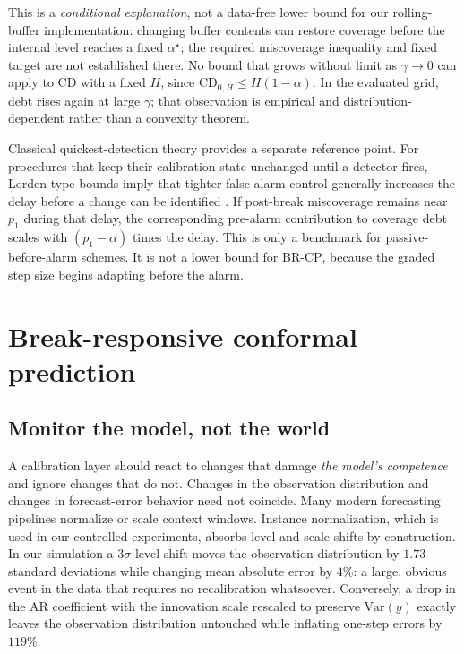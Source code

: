 \documentclass[10pt]{article}
\newcommand{\brcp}{\textsc{BR-CP}}
\begin{document}
This is a \emph{conditional explanation}, not a data-free lower bound for
our rolling-buffer implementation: changing buffer contents can restore
coverage before the internal level reaches a fixed $\alpha^\star$; the
required miscoverage inequality and fixed target are not established there.
No bound that grows without limit as $\gamma\to0$ can apply to CD with a
fixed $H$, since $\mathrm{CD}_{0,H}\leq H(1-\alpha)$.
In the evaluated grid, debt rises again at large $\gamma$; that observation
is empirical and distribution-dependent rather than a convexity theorem.

Classical quickest-detection theory provides a separate reference point. For procedures that keep their calibration state unchanged until a detector fires, Lorden-type bounds imply that tighter false-alarm control generally increases the delay before a change can be identified \citep{lorden1971procedures}. If post-break miscoverage remains near $p_1$ during that delay, the corresponding pre-alarm contribution to coverage debt scales with $(p_1-\alpha)$ times the delay. This is only a benchmark for passive-before-alarm schemes. It is not a lower bound for \brcp{}, because the graded step size begins adapting before the alarm.

\section{Break-responsive conformal prediction}
\label{sec:method}

\subsection{Monitor the model, not the world}

A calibration layer should react to changes that damage \emph{the model's
competence} and ignore changes that do not. Changes in the observation
distribution and changes in forecast-error behavior need not coincide. Many modern forecasting pipelines normalize or scale context windows. Instance normalization, which is used in our controlled experiments, absorbs level and scale shifts by construction. In our simulation a $3\sigma$ level shift moves the observation
distribution by $1.73$ standard deviations while changing mean absolute error
by $4\%$: a large, obvious event in the data that requires no recalibration
whatsoever. Conversely, a drop in the AR coefficient with the innovation scale
rescaled to preserve $\mathrm{Var}(y)$ exactly leaves the observation
distribution untouched while inflating one-step errors by $119\%$.
\end{document}
